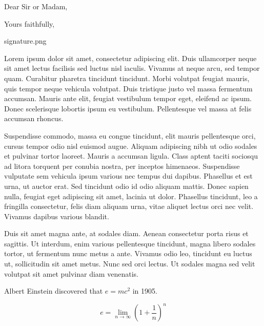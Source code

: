 \documentclass[11pt,a4paper,sans]{moderncv}        %
\begin{document}
\clearpage
\date{January 01, 1984}
\subject{Job application}
\opening{Dear Sir or Madam,}
\closing{Yours faithfully,}
\signature{0.9}{signature.png}                     %
\makelettertitle

Lorem ipsum dolor sit amet, consectetur adipiscing elit. Duis ullamcorper neque sit amet lectus facilisis sed luctus nisl iaculis. Vivamus at neque arcu, sed tempor quam. Curabitur pharetra tincidunt tincidunt. Morbi volutpat feugiat mauris, quis tempor neque vehicula volutpat. Duis tristique justo vel massa fermentum accumsan. Mauris ante elit, feugiat vestibulum tempor eget, eleifend ac ipsum. Donec scelerisque lobortis ipsum eu vestibulum. Pellentesque vel massa at felis accumsan rhoncus.

Suspendisse commodo, massa eu congue tincidunt, elit mauris pellentesque orci, cursus tempor odio nisl euismod augue. Aliquam adipiscing nibh ut odio sodales et pulvinar tortor laoreet. Mauris a accumsan ligula. Class aptent taciti sociosqu ad litora torquent per conubia nostra, per inceptos himenaeos. Suspendisse vulputate sem vehicula ipsum various nec tempus dui dapibus. Phasellus et est urna, ut auctor erat. Sed tincidunt odio id odio aliquam mattis. Donec sapien nulla, feugiat eget adipiscing sit amet, lacinia ut dolor. Phasellus tincidunt, leo a fringilla consectetur, felis diam aliquam urna, vitae aliquet lectus orci nec velit. Vivamus dapibus various blandit.

Duis sit amet magna ante, at sodales diam. Aenean consectetur porta risus et sagittis. Ut interdum, enim various pellentesque tincidunt, magna libero sodales tortor, ut fermentum nunc metus a ante. Vivamus odio leo, tincidunt eu luctus ut, sollicitudin sit amet metus. Nunc sed orci lectus. Ut sodales magna sed velit volutpat sit amet pulvinar diam venenatis.

Albert Einstein discovered that $e=mc^2$ in 1905.

\[ e=\lim_{n \to \infty} \left(1+\frac{1}{n}\right)^n \]

\makeletterclosing

\end{document}
